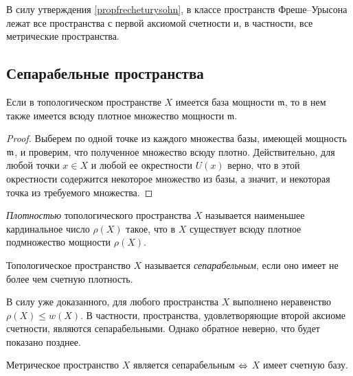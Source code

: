 \begin{note}
    В силу утверждения \ref{propfrecheturysohn}, в классе пространств Фреше--Урысона лежат все пространства с первой аксиомой счетности и, в частности, все метрические
    пространства.
\end{note}

\subsection{Сепарабельные пространства}

\begin{proposition}
    Если в топологическом пространстве $X$ имеется база мощности $\mathfrak{m}$, то в нем также имеется всюду плотное множество мощности $\mathfrak{m}$.
\end{proposition}

\begin{proof}
    Выберем по одной точке из каждого множества базы, имеющей мощность $\mathfrak m$, и проверим, что полученное множество всюду плотно. Действительно, для любой точки $x \in X$ и любой ее окрестности $U(x)$ верно, что в этой окрестности содержится некоторое множество из базы, а значит, и некоторая точка из требуемого множества. 
\end{proof}

\begin{definition}
    \textit{Плотностью} топологического пространства $X$ называется наименьшее кардинальное число $\rho (X)$ такое, что в $X$ существует всюду плотное подмножество мощности $\rho (X)$.
\end{definition}

\begin{definition}
    Топологическое пространство $X$ называется \textit{сепарабельным}, если оно имеет не более чем счетную плотность.
\end{definition}

\begin{note}
    В силу уже доказанного, для любого пространства $X$ выполнено неравенство $\rho (X)\leq w(X)$. В частности, пространства, удовлетворяющие второй аксиоме счетности, являются сепарабельными. Однако обратное неверно, что будет показано позднее.
\end{note}

\begin{theorem}\label{thmmetricseparablecond}
    Метрическое пространство $X$ является сепарабельным $\Leftrightarrow$ $X$ имеет счетную базу.
\end{theorem}

